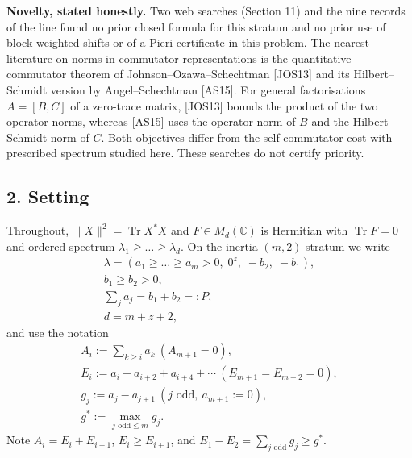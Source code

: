 \documentclass[
  11pt,
  a4paper,
]{article}
\begin{document}
\textbf{Novelty, stated honestly.} Two web searches (Section 11) and the
nine records of the line found no prior closed formula for this stratum
and no prior use of block weighted shifts or of a Pieri certificate in
this problem. The nearest literature on norms in commutator
representations is the quantitative commutator theorem of
Johnson--Ozawa--Schechtman {[}JOS13{]} and its Hilbert--Schmidt version
by Angel--Schechtman {[}AS15{]}. For general factorisations \(A=[B,\allowbreak{}C]\)
of a zero-trace matrix, {[}JOS13{]} bounds the product of the two
operator norms, whereas {[}AS15{]} uses the operator norm of \(B\) and
the Hilbert--Schmidt norm of \(C\). Both objectives differ from the
self-commutator cost with prescribed spectrum studied here. These
searches do not certify priority.

\subsection{2. Setting}\label{setting}

Throughout, \(\|X\|^2=\operatorname{Tr}X^*X\) and
\(F\in M_d(\mathbb C)\) is Hermitian with \(\operatorname{Tr}F=0\) and
ordered spectrum \(\lambda_1\ge\dots\ge\lambda_d\). On the
inertia-\((m,\allowbreak{}2)\) stratum we write
\[\begin{gathered}\lambda=(a_1\ge\dots\ge a_m>0,\;0^{z},\;-b_2,\;-b_1),\\  b_1\ge b_2>0,\\  \sum_{j}a_j=b_1+b_2=:P,\\  d=m+z+2,\end{gathered}\]
and use the notation
\[\begin{gathered}A_i:=\sum_{k\ge i}a_k\ (A_{m+1}=0),\\  E_i:=a_i+a_{i+2}+a_{i+4}+\cdots\ (E_{m+1}=E_{m+2}=0),\\  g_j:=a_j-a_{j+1}\ (j\text{ odd},\ a_{m+1}:=0),\\  g^*:=\max_{j\text{ odd}\le m}g_j.\end{gathered}\]
Note \(A_i=E_i+E_{i+1}\), \(E_i\ge E_{i+1}\), and
\(E_1-E_2=\sum_{j\text{ odd}}g_j\ge g^*\).
\end{document}
